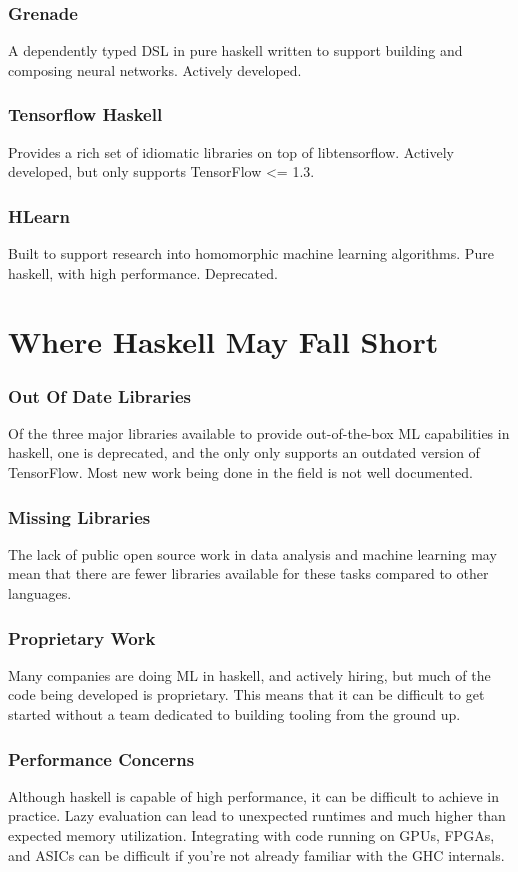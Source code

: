 \documentclass{beamer}
\begin{document}
\begin{frame}
  \frametitle{Grenade}
  A dependently typed DSL in pure haskell written to support building
  and composing neural networks.  Actively developed.
\end{frame}


\begin{frame}
  \frametitle{Tensorflow Haskell}
  Provides a rich set of idiomatic libraries on top of libtensorflow.
  Actively developed, but only supports TensorFlow <= 1.3.
\end{frame}

\begin{frame}
  \frametitle{HLearn}
  Built to support research into homomorphic machine learning
  algorithms.  Pure haskell, with high performance.  Deprecated.
\end{frame}

\section{Where Haskell May Fall Short}

\begin{frame}
  \frametitle{Out Of Date Libraries}
  Of the three major libraries available to provide out-of-the-box ML
  capabilities in haskell, one is deprecated, and the only only
  supports an outdated version of TensorFlow.  Most new work being
  done in the field is not well documented.
\end{frame}

\begin{frame}
  \frametitle{Missing Libraries}
  The lack of public open source work in data analysis and machine
  learning may mean that there are fewer libraries available for these
  tasks compared to other languages.
\end{frame}

\begin{frame}
  \frametitle{Proprietary Work}
  Many companies are doing ML in haskell, and actively hiring, but
  much of the code being developed is proprietary.  This means that it
  can be difficult to get started without a team dedicated to building
  tooling from the ground up.
\end{frame}

\begin{frame}
  \frametitle{Performance Concerns}
  Although haskell is capable of high performance, it can be difficult
  to achieve in practice.  Lazy evaluation can lead to unexpected
  runtimes and much higher than expected memory utilization.
  Integrating with code running on GPUs, FPGAs, and ASICs can be
  difficult if you're not already familiar with the GHC internals.
\end{frame}
\end{document}
